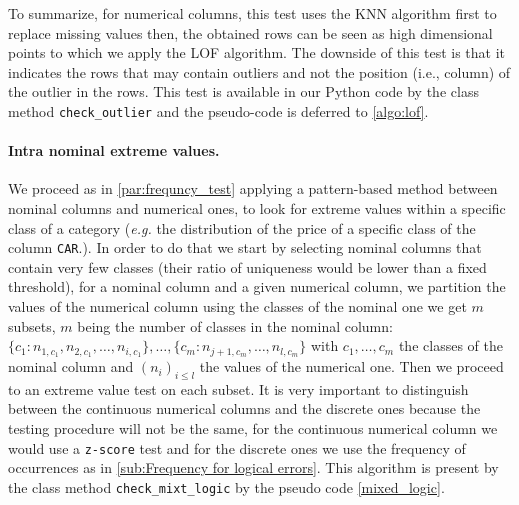 \documentclass{article}
\begin{document}
To summarize, for numerical columns, this test uses the KNN algorithm first to replace missing values then, the obtained rows can be seen as high dimensional points to which we apply the LOF algorithm.
The downside of this test is that it indicates the rows that may contain outliers and not the position (i.e., column) of the outlier in the rows.
This test is available in our Python code by the class method \texttt{check\_outlier} and the pseudo-code is deferred to \ref{algo:lof}.
\paragraph{Intra nominal extreme values.} %
\label{sub:Intra nominal extreme values}
We proceed as in \ref{par:frequncy_test} applying a pattern-based method between nominal columns and numerical ones, to look for extreme values within a specific class of a category (\textit{e.g.} the distribution of the price of a specific class of the column \texttt{CAR}.). In order to do that we start by selecting nominal columns that contain very few classes (their ratio of uniqueness would be lower than a fixed threshold), for a nominal column and a given numerical column, we partition the values of the numerical column using the classes of the nominal one we get $m$ subsets, $m$ being the number of classes in the nominal column: $\{c_1: n_{1, c_1}, n_{2, c_1}, \ldots, n_{i, c_1}\}, \ldots, \{c_m: n_{j+1, c_m}, \ldots,  n_{l, c_m}\}$ with $c_1, \ldots, c_m$ the classes of the nominal column and $(n_i)_{i \leq l}$ the values of the numerical one. Then we proceed to an extreme value test on each subset.
It is very important to distinguish between the continuous numerical columns and the discrete ones because the testing procedure will not be the same, for the continuous numerical column we would use a \texttt{z-score} test and for the discrete ones we use the frequency of occurrences as in \ref{sub:Frequency for logical errors}.
This algorithm is present by the class method \texttt{check\_mixt\_logic} by the pseudo code \ref{mixed_logic}.

\end{document}
